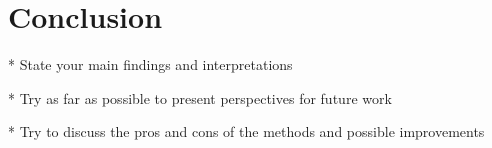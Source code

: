 \documentclass[amssymb,twocolumn,aps]{revtex4}
\begin{document}

\section{Conclusion}\label{section:conclusion} 
 * State your main findings and interpretations

 * Try as far as possible to present perspectives for future work

 * Try to discuss the pros and cons of the methods and possible improvements

\end{document}
